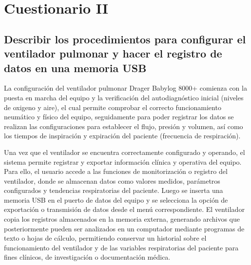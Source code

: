 \chapter{Cuestionario II}

\section{Describir los procedimientos para configurar el ventilador pulmonar y hacer el registro de datos en una memoria USB}

La configuración del ventilador pulmonar Drager Babylog 8000+ comienza con la puesta en marcha del equipo y la verificación del autodiagnóstico inicial (niveles de oxigeno y aire), el cual permite comprobar el correcto funcionamiento neumático y físico del equipo, seguidamente para poder registrar los datos se realizan las configuraciones para establecer el flujo, presión y volumen, así como los tiempos de inspiración y expiración del paciente (frecuencia de respiración).

Una vez que el ventilador se encuentra correctamente configurado y operando, el sistema permite registrar y exportar información clínica y operativa del equipo. Para ello, el usuario accede a las funciones de monitorización o registro del ventilador, donde se almacenan datos como valores medidos, parámetros configurados y tendencias respiratorias del paciente. Luego se inserta una memoria USB en el puerto de datos del equipo y se selecciona la opción de exportación o transmisión de datos desde el menú correspondiente. El ventilador copia los registros almacenados en la memoria externa, generando archivos que posteriormente pueden ser analizados en un computador mediante programas de texto o hojas de cálculo, permitiendo conservar un historial sobre el funcionamiento del ventilador y de las variables respiratorias del paciente para fines clínicos, de investigación o documentación médica.

